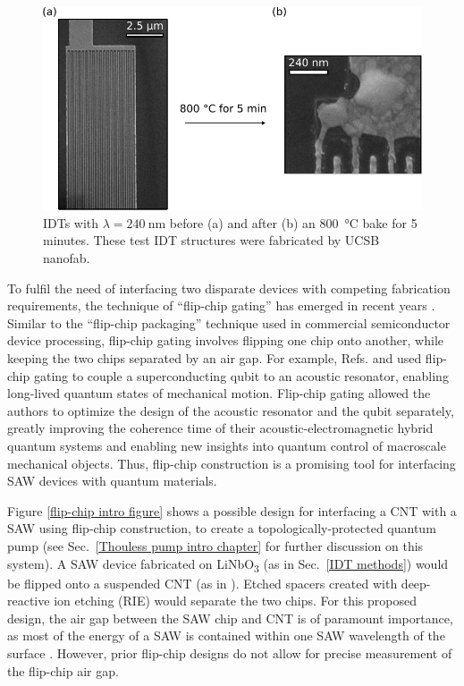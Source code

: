 \documentclass{beavtex_dub_edit}
\begin{document}
\begin{figure}
    \includegraphics[width = 1\textwidth]{IDT damaged.pdf}
    \caption{IDTs with $\lambda = \SI{240}{\nano\meter}$ before (a) and after (b) an \SI{800}{\celsius} bake for 5 minutes. These test IDT structures were fabricated by UCSB nanofab.} 
    \label{IDT damaged}
\end{figure}

To fulfil the need of interfacing two disparate devices with competing fabrication requirements, the technique of “flip-chip gating” has emerged in recent years \cite{beukman_noninvasive_2015, chu_creation_2018, satzinger_quantum_2018, robertson_non-invasive_2020}. Similar to the “flip-chip packaging” technique used in commercial semiconductor device processing, flip-chip gating involves flipping one chip onto another, while keeping the two chips separated by an air gap. For example, Refs. \cite{chu_creation_2018} and \cite{satzinger_quantum_2018} used flip-chip gating to couple a superconducting qubit to an acoustic resonator, enabling long-lived quantum states of mechanical motion. Flip-chip gating allowed the authors to optimize the design of the acoustic resonator and the qubit separately, greatly improving the coherence time of their acoustic-electromagnetic hybrid quantum systems and enabling new insights into quantum control of macroscale mechanical objects. Thus, flip-chip construction is a promising tool for interfacing SAW devices with quantum materials.

Figure \ref{flip-chip intro figure} shows a possible design for interfacing a CNT with a SAW using flip-chip construction, to create a topologically-protected quantum pump (see Sec.\ \ref{Thouless pump intro chapter} for further discussion on this system). A SAW device fabricated on LiNbO\textsubscript{3} (as in Sec.\ \ref{IDT methods}) would be flipped onto a suspended CNT (as in \cite{senger_universal_2018}). Etched spacers created with deep-reactive ion etching (RIE) would separate the two chips. For this proposed design, the air gap between the SAW chip and CNT is of paramount importance, as most of the energy of a SAW is contained within one SAW wavelength of the surface \cite{wixforth_surface_1989}. However, prior flip-chip designs do not allow for precise measurement of the flip-chip air gap.
\end{document}
